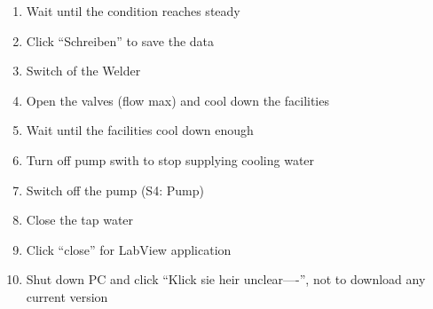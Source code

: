 \documentclass[conference]{IEEEtran}
\begin{document}
\begin{enumerate}
\begin{enumerate}
  \end{enumerate}
  \item Wait until the condition reaches steady
  \item Click ``Schreiben'' to save the data
  \item Switch of the Welder
  \item Open the valves (flow max) and cool down the facilities
  \item Wait until the facilities cool down enough
  \item Turn off pump swith to stop supplying cooling water
  \item Switch off the pump (S4: Pump)
  \item Close the tap water
  \item Click ``close'' for LabView application
  \item Shut down PC and click ``Klick sie heir unclear----'', not to download any current version
\end{enumerate}
\end{document}

